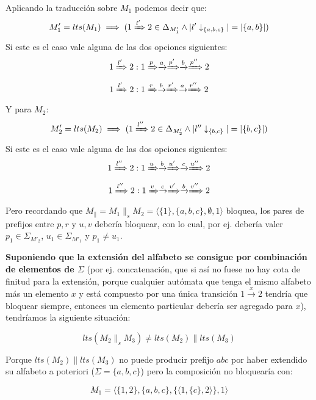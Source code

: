 Aplicando la traducción sobre $M_1$ podemos decir que:
\[M'_1 = lts(M_1) \implies ( 1 \xRightarrow[]{l'} 2 \in \Delta_{M'_1} \wedge |l'\downarrow_{\lbrace a,b,c\rbrace}|= |\lbrace a, b \rbrace | )\]
Si este es el caso vale alguna de las dos opciones siguientes:
\[1 \xRightarrow[]{l'} 2: 1 \xRightarrow[]{p}\xrightarrow{a}\xRightarrow[]{p'}\xrightarrow{b}\xRightarrow[]{p''}2\]
\[1 \xRightarrow[]{l'} 2: 1 \xRightarrow[]{r}\xrightarrow{b}\xRightarrow[]{r'}\xrightarrow{a}\xRightarrow[]{r''}2\]
Y para $M_2$:
\[M'_2 = lts(M_2) \implies ( 1 \xRightarrow[]{l''} 2 \in \Delta_{M'_2} \wedge |l''\downarrow_{\lbrace b,c\rbrace}|= |\lbrace b,c \rbrace | )\]
Si este es el caso vale alguna de las dos opciones siguientes:
\[1 \xRightarrow[]{l''} 2: 1 \xRightarrow[]{u}\xrightarrow{b}\xRightarrow[]{u'}\xrightarrow{c}\xRightarrow[]{u''}2\]
\[1 \xRightarrow[]{l''} 2: 1 \xRightarrow[]{v}\xrightarrow{c}\xRightarrow[]{v'}\xrightarrow{b}\xRightarrow[]{v''}2\]
Pero recordando que $M_{\parallel}=M_1 \parallel_s M_2=\langle \lbrace 1 \rbrace, \lbrace a,b,c \rbrace, \emptyset, 1 \rangle$ bloquea, los pares de prefijos entre $p,r$ y $u,v$ debería bloquear, con lo cual, por ej. debería valer $p_1 \in \Sigma_{M'_2}$, $u_1 \in \Sigma_{M'_1}$ y $p_1 \neq u_1$.

\textbf{Suponiendo que la extensión del alfabeto se consigue por combinación de elementos de $\Sigma$} (por ej. concatenación, que si así no fuese no hay cota de finitud para la extensión, porque cualquier autómata que tenga el mismo alfabeto más un elemento $x$ y está compuesto por una única transición $1 \xrightarrow{x} 2$ tendría que bloquear siempre, entonces un elemento particular debería ser agregado para $x$), tendríamos la siguiente situación:

\[lts(M_2 \parallel_s M_3) \neq lts(M_2)\parallel lts(M_3)\]

Porque $lts(M_2)\parallel lts(M_3)$ no puede producir prefijo $abc$ por haber extendido su alfabeto a poteriori ($\Sigma = \lbrace a,b,c \rbrace$)
pero la composición no bloquearía con:

\[M_1 = \langle \lbrace 1,2 \rbrace, \lbrace a,b,c \rbrace, \lbrace\langle 1, \lbrace c \rbrace, 2 \rangle\rbrace, 1 \rangle\]